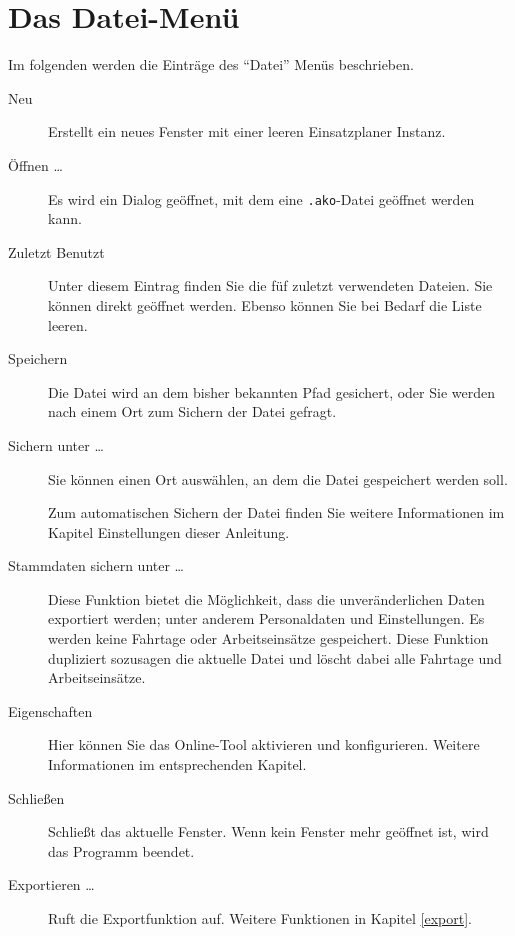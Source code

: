 \section{Das Datei-Menü}
Im folgenden werden die Einträge des ``Datei'' Menüs beschrieben.
\begin{description}
  \item[Neu]
  Erstellt ein neues Fenster mit einer leeren Einsatzplaner Instanz.

  \item[Öffnen \dots]
  Es wird ein Dialog geöffnet, mit dem eine \texttt{.ako}-Datei geöffnet werden kann.

  \item[Zuletzt Benutzt]
  Unter diesem Eintrag finden Sie die füf zuletzt verwendeten Dateien.
  Sie können direkt geöffnet werden.
  Ebenso können Sie bei Bedarf die Liste leeren.

  \item[Speichern]
  Die Datei wird an dem bisher bekannten Pfad gesichert, oder Sie werden nach einem Ort zum Sichern der Datei gefragt.

  \item[Sichern unter \dots]
  Sie können einen Ort auswählen, an dem die Datei gespeichert werden soll.

  Zum automatischen Sichern der Datei finden Sie weitere Informationen im Kapitel Einstellungen dieser Anleitung.

  \item[Stammdaten sichern unter \dots]
  Diese Funktion bietet die Möglichkeit, dass die unveränderlichen Daten exportiert werden; unter anderem Personaldaten und Einstellungen.
  Es werden keine Fahrtage oder Arbeitseinsätze gespeichert.
  Diese Funktion dupliziert sozusagen die aktuelle Datei und löscht dabei alle Fahrtage und Arbeitseinsätze.


  \item[Eigenschaften]
  Hier können Sie das Online-Tool aktivieren und konfigurieren.
  Weitere Informationen im entsprechenden Kapitel.

  \item[Schließen]
  Schließt das aktuelle Fenster.
  Wenn kein Fenster mehr geöffnet ist, wird das Programm beendet.

  \item[Exportieren \dots]
  Ruft die Exportfunktion auf.
  Weitere Funktionen in Kapitel \ref{export}.
\end{description}

